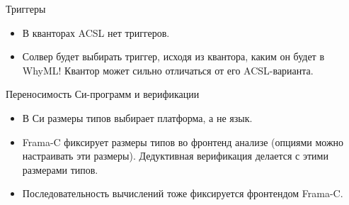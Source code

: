 \documentclass[hyperref={unicode=true}]{beamer}
\begin{document}
    \begin{frame}{Триггеры}
    \begin{itemize}
    \item
    В кванторах ACSL нет триггеров.
    \item
    Солвер будет выбирать триггер, исходя из квантора, каким
    он будет в WhyML! Квантор может сильно отличаться
    от его ACSL-варианта.
    \end{itemize}
    \end{frame}

    \begin{frame}{Переносимость Си-программ и верификации}
    \begin{itemize}
    \item
    В Си размеры типов выбирает платформа, а не язык.
    \item
    Frama-C фиксирует размеры типов во фронтенд анализе
    (опциями можно настраивать эти размеры). Дедуктивная
    верификация делается с этими размерами типов.
    \item
    Последовательность вычислений тоже фиксируется
    фронтендом Frama-C.
    \end{itemize}
    \end{frame}
\end{document}
